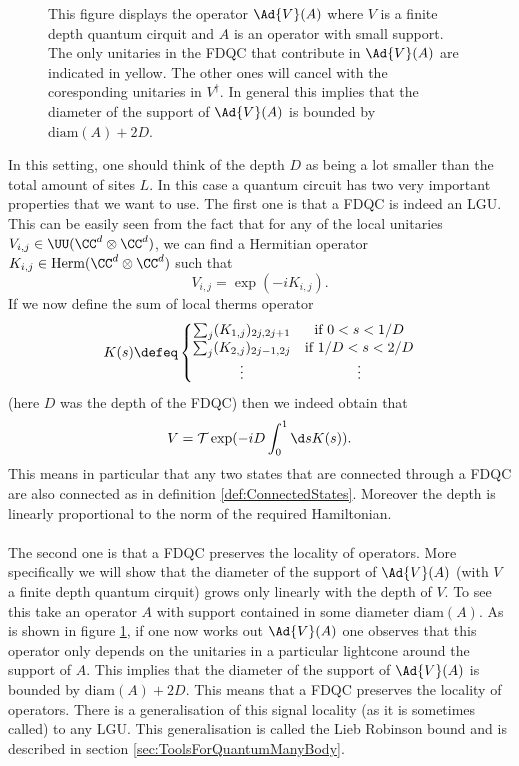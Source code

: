 \begin{figure}
	\centering
	
	\caption{This figure displays the operator $\Ad{V}(A)$ where $V$ is a finite depth quantum cirquit and $A$ is an operator with small support. The only unitaries in the FDQC that contribute in $\Ad{V}(A)$ are indicated in yellow. The other ones will cancel with the coresponding unitaries in $V^\dagger$. In general this implies that the diameter of the support of $\Ad{V}(A)$ is bounded by $\text{diam}(A)+2D$.}
	\label{fig:FiniteDepthQuantumCirquitLightcone}
\end{figure}
In this setting, one should think of the depth $D$ as being a lot smaller than the total amount of sites $L$. In this case a quantum circuit has two very important properties that we want to use. The first one is that a FDQC is indeed an LGU. This can be easily seen from the fact that for any of the local unitaries $V_{i,j}\in\UU(\CC^d\otimes\CC^d)$, we can find a Hermitian operator $K_{i,j}\in\textrm{Herm}(\CC^d\otimes\CC^d)$ such that
\begin{equation}
V_{i,j}=\exp(-i K_{i,j}).
\end{equation}
If we now define the sum of local therms operator
\begin{equation}
K(s)\defeq \left\{\begin{matrix}
\sum_{j}(K_{1,j})_{2j,2j+1}&\text{if }0<s<1/D\\
\sum_{j}(K_{2,j})_{2j-1,2j}&\text{if }1/D<s<2/D\\
\vdots&\vdots
\end{matrix}\right.
\end{equation}
(here $D$ was the depth of the FDQC) then we indeed obtain that
\begin{equation}
V=\mathcal{T}\exp(-iD\int_0^1 \d s K(s)).
\end{equation}
This means in particular that any two states that are connected through a FDQC are also connected as in definition \ref{def:ConnectedStates}. Moreover the depth is linearly proportional to the norm of the required Hamiltonian.\\\\
The second one is that a FDQC preserves the locality of operators. More specifically we will show that the diameter of the support of $\Ad{V}(A)$ (with $V$ a finite depth quantum cirquit) grows only linearly with the depth of $V$. To see this take an operator $A$ with support contained in some diameter $\text{diam}(A)$. As is shown in figure \ref{fig:FiniteDepthQuantumCirquitLightcone}, if one now works out $\Ad{V}(A)$ one observes that this operator only depends on the unitaries in a particular lightcone around the support of $A$. This implies that the diameter of the support of $\Ad{V}(A)$ is bounded by $\text{diam}(A)+2D$. This means that a FDQC preserves the locality of operators. There is a generalisation of this signal locality (as it is sometimes called) to any LGU. This generalisation is called the Lieb Robinson bound and is described in section \ref{sec:ToolsForQuantumManyBody}.
